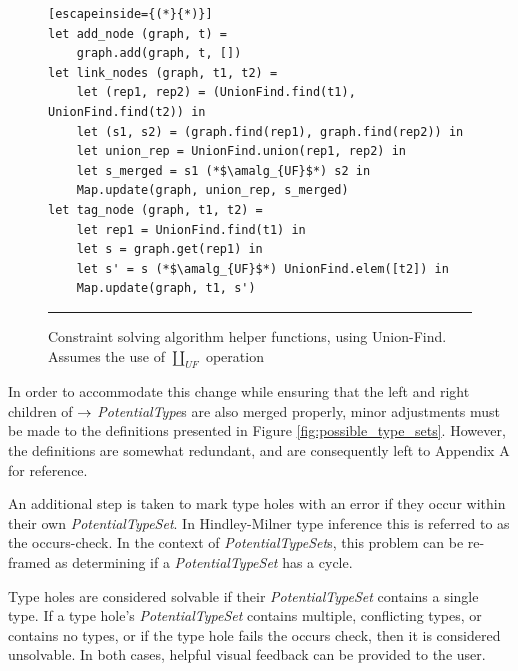 \begin{figure}[h!]
\begin{lstlisting}[escapeinside={(*}{*)}]
let add_node (graph, t) =
    graph.add(graph, t, [])
let link_nodes (graph, t1, t2) =
    let (rep1, rep2) = (UnionFind.find(t1), UnionFind.find(t2)) in
    let (s1, s2) = (graph.find(rep1), graph.find(rep2)) in
    let union_rep = UnionFind.union(rep1, rep2) in
    let s_merged = s1 (*$\amalg_{UF}$*) s2 in
    Map.update(graph, union_rep, s_merged)
let tag_node (graph, t1, t2) =
    let rep1 = UnionFind.find(t1) in
    let s = graph.get(rep1) in
    let s' = s (*$\amalg_{UF}$*) UnionFind.elem([t2]) in
    Map.update(graph, t1, s')
\end{lstlisting}
\vspace{-2px}
\hrule
\caption{Constraint solving algorithm helper functions, using Union-Find. Assumes the use of $\amalg_{UF}$ operation}
\label{fig:algcode_construct_graph_helpers}
\end{figure}

In order to accommodate this change while ensuring that the left and right children of $\rightarrow$ \textit{PotentialType}s are also merged properly, minor adjustments must be made to the definitions presented in Figure \ref{fig:possible_type_sets}. However, the definitions are somewhat redundant, and are consequently left to Appendix A for reference.

An additional step is taken to mark type holes with an error if they occur within their own \textit{PotentialTypeSet}. In Hindley-Milner type inference this is referred to as the occurs-check. In the context of \textit{PotentialTypeSet}s, this problem can be re-framed as determining if a \textit{PotentialTypeSet} has a cycle.

Type holes are considered solvable if their \textit{PotentialTypeSet} contains a single type. If a type hole's \textit{PotentialTypeSet} contains multiple, conflicting types, or contains no types, or if the type hole fails the occurs check, then it is considered unsolvable. In both cases, helpful visual feedback can be provided to the user.


